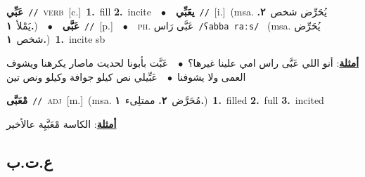 \documentclass[10pt,a4paper,twoside]{article} %
\begin{document}
\begin{multicols}{2}
{{{{{{{{{{\setlength\topsep{0pt}\textbf{\foreignlanguage{arabic}{عَبِّي}}\ {\color{gray}\texttt{//}\color{black}}\ \textsc{verb}\ [c.]\ \textbf{1.}~fill  \textbf{2.}~incite\ \ $\bullet$\ \ \setlength\topsep{0pt}\textbf{\foreignlanguage{arabic}{يعَبِّي}}\ {\color{gray}\texttt{//}\color{black}}\ [i.]\ \color{gray}(msa. \foreignlanguage{arabic}{يُحَرِّض شخص}~\foreignlanguage{arabic}{\textbf{٢.}}  \foreignlanguage{arabic}{يَمْلأ}~\foreignlanguage{arabic}{\textbf{١.}})\color{black}\ \ $\bullet$\ \ \setlength\topsep{0pt}\textbf{\foreignlanguage{arabic}{عَبَّى}}\ {\color{gray}\texttt{//}\color{black}}\ [p.]\ \ $\bullet$\ \ \textsc{ph.} \color{gray} \foreignlanguage{arabic}{عَبَّى رَاس}\color{black}\ {\color{gray}\texttt{/{\sffamily ʕabba raːs}/}\color{black}}\ \color{gray} (msa. \foreignlanguage{arabic}{يُحَرِّض شخص}~\foreignlanguage{arabic}{\textbf{١.}})\color{black}\ \textbf{1.}~incite sb\  \begin{flushright}\color{gray}\foreignlanguage{arabic}{\textbf{\underline{\foreignlanguage{arabic}{أمثلة}}}: أنو اللي عَبَّى راس امي علينا غيرها؟\ $\bullet$\ \  عَبَّت بأبونا لحديت ماصار يكرهنا ويشوف العمى ولا يشوفنا\ $\bullet$\ \  عَبِّيلي نص كيلو جوافة وكيلو ونص تين}\end{flushright}\color{black}} \vspace{2mm}

{\setlength\topsep{0pt}\textbf{\foreignlanguage{arabic}{مْعَبَّى}}\ {\color{gray}\texttt{//}\color{black}}\ \textsc{adj}\ [m.]\ \color{gray}(msa. \foreignlanguage{arabic}{مُحَرَّض}~\foreignlanguage{arabic}{\textbf{٢.}}  \foreignlanguage{arabic}{ممتلِىء}~\foreignlanguage{arabic}{\textbf{١.}})\color{black}\ \textbf{1.}~filled  \textbf{2.}~full  \textbf{3.}~incited\  \begin{flushright}\color{gray}\foreignlanguage{arabic}{\textbf{\underline{\foreignlanguage{arabic}{أمثلة}}}: الكاسة مْعَبَّيِة عالأخير}\end{flushright}\color{black}} \vspace{2mm}

\vspace{-3mm}
\subsection*{\color{blue}\foreignlanguage{arabic}{ع.ت.ب}\color{blue}{}} 

}}}}}}}}}
\end{multicols}
\end{document}
